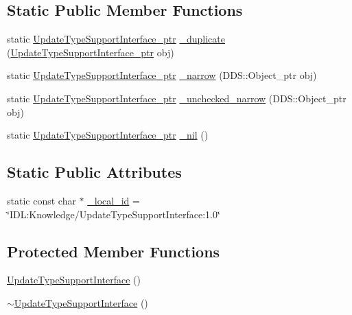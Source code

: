 \subsection*{Static Public Member Functions}
\begin{DoxyCompactItemize}
\item 
static \hyperlink{classKnowledge_1_1UpdateTypeSupportInterface}{UpdateTypeSupportInterface\_\-ptr} \hyperlink{classKnowledge_1_1UpdateTypeSupportInterface_a2b3c533d87e22886cc8230dbe184ffd7}{\_\-duplicate} (\hyperlink{classKnowledge_1_1UpdateTypeSupportInterface}{UpdateTypeSupportInterface\_\-ptr} obj)
\item 
static \hyperlink{classKnowledge_1_1UpdateTypeSupportInterface}{UpdateTypeSupportInterface\_\-ptr} \hyperlink{classKnowledge_1_1UpdateTypeSupportInterface_a1e632360831599f2dd690e815ee8764e}{\_\-narrow} (DDS::Object\_\-ptr obj)
\item 
static \hyperlink{classKnowledge_1_1UpdateTypeSupportInterface}{UpdateTypeSupportInterface\_\-ptr} \hyperlink{classKnowledge_1_1UpdateTypeSupportInterface_a04c376dcc7e26af2ee98d3d566e9de92}{\_\-unchecked\_\-narrow} (DDS::Object\_\-ptr obj)
\item 
static \hyperlink{classKnowledge_1_1UpdateTypeSupportInterface}{UpdateTypeSupportInterface\_\-ptr} \hyperlink{classKnowledge_1_1UpdateTypeSupportInterface_abcf482b666564230b905123a85faa2db}{\_\-nil} ()
\end{DoxyCompactItemize}
\subsection*{Static Public Attributes}
\begin{DoxyCompactItemize}
\item 
static const char $\ast$ \hyperlink{classKnowledge_1_1UpdateTypeSupportInterface_a4ae733778e6ac777af3c82fe4ff2927d}{\_\-local\_\-id} = \char`\"{}IDL:Knowledge/UpdateTypeSupportInterface:1.0\char`\"{}
\end{DoxyCompactItemize}
\subsection*{Protected Member Functions}
\begin{DoxyCompactItemize}
\item 
\hyperlink{classKnowledge_1_1UpdateTypeSupportInterface_a89f07148c1e07131f69746ea521e2ccc}{UpdateTypeSupportInterface} ()
\item 
\hyperlink{classKnowledge_1_1UpdateTypeSupportInterface_a9b310ae8a4646d0f56929d3fad3e5d61}{$\sim$UpdateTypeSupportInterface} ()
\end{DoxyCompactItemize}
